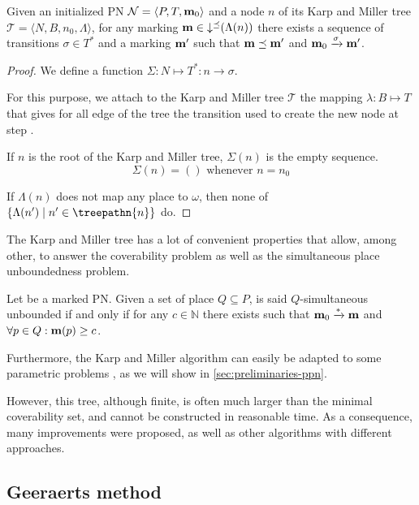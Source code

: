 \begin{lemm}
  Given an initialized \ac{PN} $\mathcal{N} = \langle P,T, \mathbf{m}_0\rangle$ and a node $n$ of its Karp and Miller tree $\mathcal{T} = \langle N, B, n_0, \Lambda\rangle$,
  for any marking $\mathbf{m} \in \operatorname{\downarrow^\preceq}(\Lambda(n))$ there exists a sequence of transitions $\sigma \in T^*$ and a marking $\mathbf{m'}$ such that $\mathbf{m} \preceq \mathbf{m'}$ and $\mathbf{m}_0 \xrightarrow{\sigma} \mathbf{m'}$.
\end{lemm}
\begin{proof}
  We define a function $\Sigma : N \mapsto T^* : n \rightarrow \sigma$.

  For this purpose, we attach to the Karp and Miller tree $\mathcal{T}$ the mapping $\lambda : B \mapsto T$ that gives for all edge of the tree the transition used to create the new node at step .

  If $n$ is the root of the Karp and Miller tree, $\Sigma(n)$ is the empty sequence.
  \[ \Sigma(n) = () \text{ whenever } n = n_0 \]

  If $\Lambda(n)$ does not map any place to $\omega$, then none of $\left\{\Lambda(n') \mid n' \in \treepathn{n}\right\}$ do.

\end{proof}


The Karp and Miller tree has a lot of convenient properties that allow, among other, to answer the coverability problem as well as the simultaneous place unboundedness problem.

\begin{defi}
  Let \NPTm be a marked \ac{PN}.
  Given a set of place $Q \subseteq P$, \N is said $Q$-simultaneous unbounded if and only if for any $c \in \mathbb{N}$ there exists \mar such that $\mathbf{m}_0 \xrightarrow{*} \mathbf{m}$ and $\forall p \in Q : \mathbf{m}(p) \geq c$.
\end{defi}

Furthermore, the Karp and Miller algorithm can easily be adapted to some parametric problems \cite{David17}, as we will show in \autoref{sec:preliminaries-ppn}.

However, this tree, although finite, is often much larger than the minimal coverability set, and cannot be constructed in reasonable time.
As a consequence, many improvements were proposed, as well as other algorithms with different approaches.

\subsection{Geeraerts method}
\label{sec:eff}

